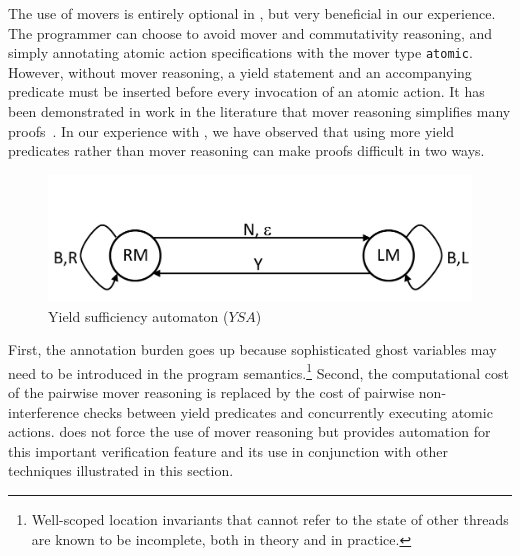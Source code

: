 The use of movers is entirely optional in \civl, but very beneficial
in our experience. The programmer can choose to avoid mover and
commutativity reasoning, and simply
annotating atomic action specifications with the mover type {\tt atomic}.
However, without mover reasoning,  a yield statement and an
accompanying predicate
must be inserted before every invocation of an atomic action.
It has been demonstrated in work in the literature that mover
reasoning simplifies many proofs~\cite{ElmasQT09}. 
In our experience with \civl, we have observed that using more yield
predicates rather than mover reasoning can make proofs difficult in two ways.
\begin{figure}
\begin{center}
\includegraphics[scale=0.25]{YieldTypeCheckingAutomaton.pdf}
\end{center} 
\caption{Yield sufficiency automaton ($YSA$)}
\label{fig:ysa}
\end{figure}
First, the annotation burden goes up because sophisticated ghost variables may need to be introduced in the 
program semantics.\footnote{Well-scoped location invariants that cannot refer to the state of other threads are known to be incomplete, 
both in theory and in practice.}
Second, the computational cost of the pairwise mover reasoning is replaced by the cost of pairwise non-interference checks between yield predicates 
and concurrently executing atomic actions. 
\civl does not force the use of mover
reasoning but provides automation for this important verification
feature and its use in conjunction with other techniques illustrated in
this section. 

